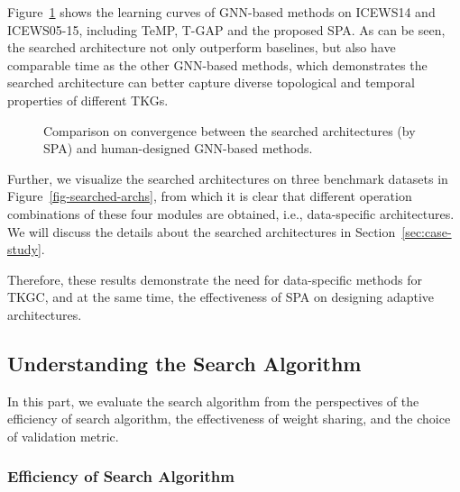 \documentclass[11pt]{article}
\begin{document}
Figure~\ref{fig-learning_curve} shows the learning curves of GNN-based methods on ICEWS14 and ICEWS05-15, 
including TeMP, 
T-GAP and the proposed SPA.
As can be seen,
the searched architecture not only outperform baselines, 
but also have comparable time as the other GNN-based methods,
which demonstrates the searched architecture can better capture diverse topological and temporal properties of different TKGs.

\begin{figure}[!ht]
	\vspace{-10px}
\caption{Comparison on convergence between the searched architectures (by SPA) and human-designed GNN-based methods.} 
	\label{fig-learning_curve}
	\vspace{-10px}
\end{figure}
Further, 
we visualize the searched architectures on three benchmark datasets in Figure~\ref{fig-searched-archs}, 
from which it is clear that different operation combinations of these four modules 
are obtained, 
i.e., data-specific architectures.
We will discuss the details about the searched architectures in Section~\ref{sec:case-study}.

Therefore, 
these results demonstrate the need for data-specific methods for TKGC, 
and at the same time, 
the effectiveness of SPA on designing adaptive architectures.

\subsection{Understanding the Search Algorithm}

In this part,
we evaluate the search algorithm from the perspectives of the efficiency of search algorithm, 
the effectiveness of weight sharing, 
and the choice of validation metric. 

\subsubsection{Efficiency of Search Algorithm}
\end{document}
